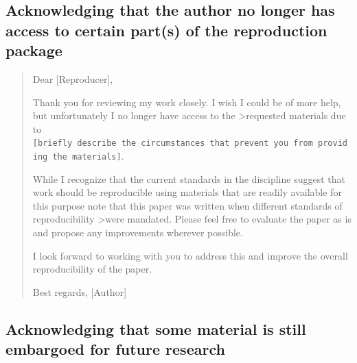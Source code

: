 \documentclass[
]{book}
\begin{document}
\hypertarget{acknowledging-that-the-author-no-longer-has-access-to-certain-parts-of-the-reproduction-package}{%
\subsection{Acknowledging that the author no longer has access to certain part(s) of the reproduction package}\label{acknowledging-that-the-author-no-longer-has-access-to-certain-parts-of-the-reproduction-package}}

\begin{quote}
Dear {[}Reproducer{]},

Thank you for reviewing my work closely. I wish I could be of more help, but unfortunately I no longer have access to the \textgreater requested materials due to \texttt{{[}briefly\ describe\ the\ circumstances\ that\ prevent\ you\ from\ providing\ the\ materials{]}}.

While I recognize that the current standards in the discipline suggest that work should be reproducible using materials that are readily available for this purpose note that this paper was written when different standards of reproducibility \textgreater were mandated. Please feel free to evaluate the paper as is and propose any improvements wherever possible.

I look forward to working with you to address this and improve the overall reproducibility of the paper.

Best regards,
{[}Author{]}
\end{quote}

\hypertarget{acknowledging-that-some-material-is-still-embargoed-for-future-research}{%
\subsection{Acknowledging that some material is still embargoed for future research}\label{acknowledging-that-some-material-is-still-embargoed-for-future-research}}
\end{document}
